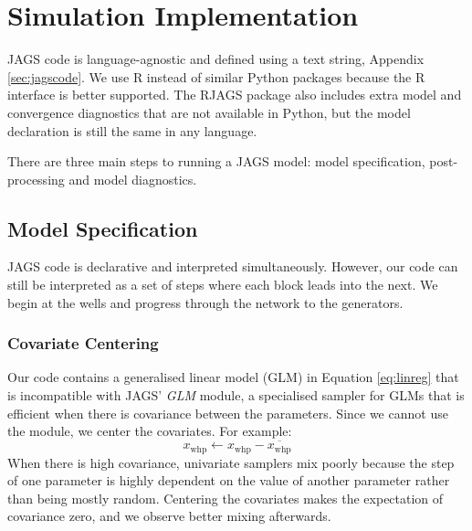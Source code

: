 \documentclass[a4paper, 12pt]{article}
\begin{document}

\section{Simulation Implementation}
JAGS code is language-agnostic and defined using a text string, Appendix \ref{sec:jagscode}. We use R instead of similar Python packages because the R interface is better supported. The RJAGS package also includes extra model and convergence diagnostics that are not available in Python, but the model declaration is still the same in any language.

There are three main steps to running a JAGS model: model specification, post-processing and model diagnostics.

\subsection{Model Specification}
JAGS code is declarative and interpreted simultaneously. However, our code can still be interpreted as a set of steps where each block leads into the next. We begin at the wells and progress through the network to the generators.

\subsubsection{Covariate Centering}
Our code contains a generalised linear model (GLM) in Equation \ref{eq:linreg} that is incompatible with JAGS' \emph{GLM} module, a specialised sampler for GLMs that is efficient when there is covariance between the parameters. Since we cannot use the module, we center the covariates. For example:
\begin{equation}
x_\text{whp} \leftarrow x_\text{whp} - \overline{x_\text{whp}}
\end{equation}
When there is high covariance, univariate samplers mix poorly because the step of one parameter is highly dependent on the value of another parameter rather than being mostly random. Centering the covariates makes the expectation of covariance zero, and we observe better mixing afterwards.
\end{document}
